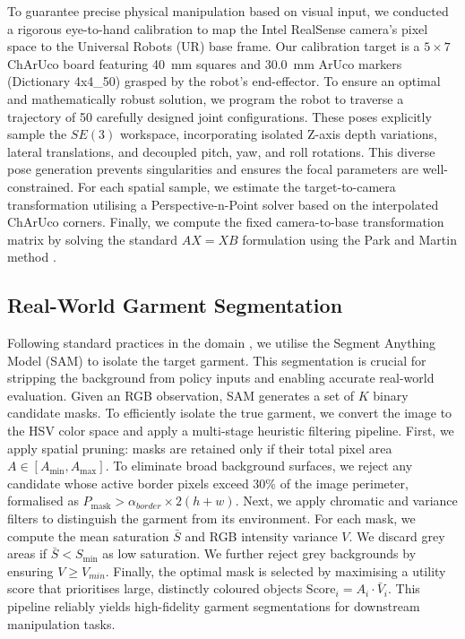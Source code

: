 \documentclass[journal]{IEEEtran}
\begin{document}
To guarantee precise physical manipulation based on visual input, we conducted a rigorous eye-to-hand calibration to map the Intel RealSense camera's pixel space to the Universal Robots (UR) base frame. Our calibration target is a $5 \times 7$ ChArUco board \cite{garrido2014automatic} featuring 40~mm squares and 30.0~mm ArUco markers (Dictionary 4x4\_50) grasped by the robot's end-effector. To ensure an optimal and mathematically robust solution, we program the robot to traverse a trajectory of 50 carefully designed joint configurations. These poses explicitly sample the $SE(3)$ workspace, incorporating isolated Z-axis depth variations, lateral translations, and decoupled pitch, yaw, and roll rotations. This diverse pose generation prevents singularities and ensures the focal parameters are well-constrained. For each spatial sample, we estimate the target-to-camera transformation utilising a Perspective-n-Point solver based on the interpolated ChArUco corners. Finally, we compute the fixed camera-to-base transformation matrix by solving the standard $AX=XB$ formulation using the Park and Martin method \cite{park1994robot}.


\subsection{Real-World Garment Segmentation} \label{sec:real-world-cloth-seg}
Following standard practices in the domain \cite{canberk2022cloth, lin2022learning, kadi2025draper}, we utilise the Segment Anything Model (SAM) \cite{kirillov2023segment} to isolate the target garment. This segmentation is crucial for stripping the background from policy inputs and enabling accurate real-world evaluation. Given an RGB observation, SAM generates a set of $K$ binary candidate masks. To efficiently isolate the true garment, we convert the image to the HSV color space and apply a multi-stage heuristic filtering pipeline. First, we apply spatial pruning: masks are retained only if their total pixel area $A \in [A_{\text{min}}, A_{\text{max}}]$. To eliminate broad background surfaces, we reject any candidate whose active border pixels exceed 30\% of the image perimeter, formalised as $P_{\text{mask}} > \alpha_{border} \times 2(h + w)$. Next, we apply chromatic and variance filters to distinguish the garment from its environment. For each mask, we compute the mean saturation $\bar{S}$ and RGB intensity variance $V$. We discard grey areas if $\bar{S} < S_{\text{min}}$ as low saturation. We further reject grey backgrounds by ensuring $ V \geq V_{min}$. Finally, the optimal mask is selected by maximising a utility score that prioritises large, distinctly coloured objects $\text{Score}_i = A_i \cdot \bar{V}_i$. This pipeline reliably yields high-fidelity garment segmentations for downstream manipulation tasks.
\end{document}
